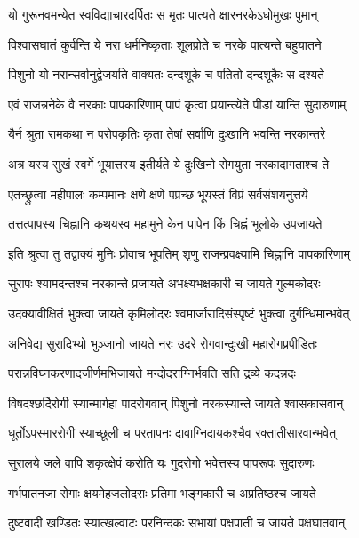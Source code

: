 \twolineshloka
{यो गुरूनवमन्येत स्वविद्याचारदर्पितः}
{स मृतः पात्यते क्षारनरकेऽधोमुखः पुमान्}%

\twolineshloka
{विश्वासघातं कुर्वन्ति ये नरा धर्मनिष्कृताः}
{शूलप्रोते च नरके पात्यन्ते बहुयातने}%

\twolineshloka
{पिशुनो यो नरान्सर्वानुद्वेजयति वाक्यतः}
{दन्दशूके च पतितो दन्दशूकैः स दश्यते}%

\twolineshloka
{एवं राजन्ननेके वै नरकाः पापकारिणाम्}
{पापं कृत्वा प्रयान्त्येते पीडां यान्ति सुदारुणाम्}%

\twolineshloka
{यैर्न श्रुता रामकथा न परोपकृतिः कृता}
{तेषां सर्वाणि दुःखानि भवन्ति नरकान्तरे}%

\twolineshloka
{अत्र यस्य सुखं स्वर्गे भूयात्तस्य इतीर्यते}
{ये दुःखिनो रोगयुता नरकादागताश्च ते}%


\twolineshloka
{एतच्छ्रुत्वा महीपालः कम्पमानः क्षणे क्षणे}
{पप्रच्छ भूयस्तं विप्रं सर्वसंशयनुत्तये}%

\twolineshloka
{तत्तत्पापस्य चिह्नानि कथयस्व महामुने}
{केन पापेन किं चिह्नं भूलोके उपजायते}%

\twolineshloka
{इति श्रुत्वा तु तद्वाक्यं मुनिः प्रोवाच भूपतिम्}
{शृणु राजन्प्रवक्ष्यामि चिह्नानि पापकारिणाम्}%


\twolineshloka
{सुरापः श्यामदन्तश्च नरकान्ते प्रजायते}
{अभक्ष्यभक्षकारी च जायते गुल्मकोदरः}%

\twolineshloka
{उदक्यावीक्षितं भुक्त्वा जायते कृमिलोदरः}
{श्वमार्जारादिसंस्पृष्टं भुक्त्वा दुर्गन्धिमान्भवेत्}%

\twolineshloka
{अनिवेद्य सुरादिभ्यो भुञ्जानो जायते नरः}
{उदरे रोगवान्दुःखी महारोगप्रपीडितः}%

\twolineshloka
{परान्नविघ्नकरणादजीर्णमभिजायते}
{मन्दोदराग्निर्भवति सति द्रव्ये कदन्नदः}%

\twolineshloka
{विषदश्छर्दिरोगी स्यान्मार्गहा पादरोगवान्}
{पिशुनो नरकस्यान्ते जायते श्वासकासवान्}%

\twolineshloka
{धूर्तोऽपस्माररोगी स्याच्छूली च परतापनः}
{दावाग्निदायकश्चैव रक्तातीसारवान्भवेत्}%

\twolineshloka
{सुरालये जले वापि शकृत्क्षेपं करोति यः}
{गुदरोगो भवेत्तस्य पापरूपः सुदारुणः}%

\twolineshloka
{गर्भपातनजा रोगाः क्षयमेहजलोदराः}
{प्रतिमा भङ्गकारी च अप्रतिष्ठश्च जायते}%

\twolineshloka
{दुष्टवादी खण्डितः स्यात्खल्वाटः परनिन्दकः}
{सभायां पक्षपाती च जायते पक्षघातवान्}%

